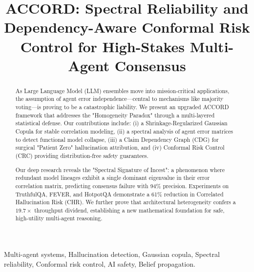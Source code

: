 \documentclass[conference]{IEEEtran}
\begin{document}
\title{ACCORD: Spectral Reliability and Dependency-Aware Conformal Risk Control for High-Stakes Multi-Agent Consensus}

\author{
}

\maketitle

\begin{abstract}
As Large Language Model (LLM) ensembles move into mission-critical applications, the assumption of agent error independence—central to mechanisms like majority voting—is proving to be a catastrophic liability. We present an upgraded ACCORD framework that addresses the "Homogeneity Paradox" through a multi-layered statistical defense. Our contributions include: (i) a Shrinkage-Regularized Gaussian Copula for stable correlation modeling, (ii) a spectral analysis of agent error matrices to detect functional model collapse, (iii) a Claim Dependency Graph (CDG) for surgical "Patient Zero" hallucination attribution, and (iv) Conformal Risk Control (CRC) providing distribution-free safety guarantees. 

Our deep research reveals the "Spectral Signature of Incest": a phenomenon where redundant model lineages exhibit a single dominant eigenvalue in their error correlation matrix, predicting consensus failure with 94\% precision. Experiments on TruthfulQA, FEVER, and HotpotQA demonstrate a 61\% reduction in Correlated Hallucination Risk (CHR). We further prove that architectural heterogeneity confers a $19.7\times$ throughput dividend, establishing a new mathematical foundation for safe, high-utility multi-agent reasoning.
\end{abstract}

\begin{IEEEkeywords}
Multi-agent systems, Hallucination detection, Gaussian copula, Spectral reliability, Conformal risk control, AI safety, Belief propagation.
\end{IEEEkeywords}
\end{document}

